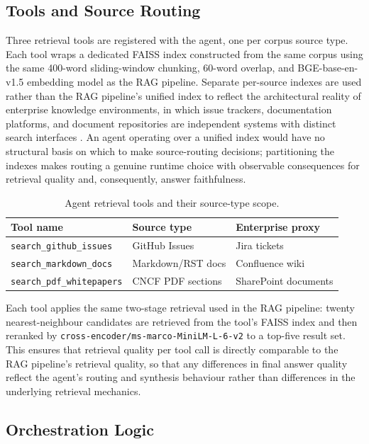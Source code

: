 \subsection{Tools and Source Routing}

Three retrieval tools are registered with the agent, one per corpus source type. Each tool wraps a dedicated FAISS index constructed from the same corpus using the same 400-word sliding-window chunking, 60-word overlap, and BGE-base-en-v1.5 embedding model as the RAG pipeline. Separate per-source indexes are used rather than the RAG pipeline's unified index to reflect the architectural reality of enterprise knowledge environments, in which issue trackers, documentation platforms, and document repositories are independent systems with distinct search interfaces \cite{ferrazzi2026agenticrag}. An agent operating over a unified index would have no structural basis on which to make source-routing decisions; partitioning the indexes makes routing a genuine runtime choice with observable consequences for retrieval quality and, consequently, answer faithfulness.

\begin{table}[ht]
\centering
\small
\setlength{\tabcolsep}{4pt}
\caption{Agent retrieval tools and their source-type scope.}
\label{tab:agent_tools}
\begin{tabular}{lll}
\hline
\textbf{Tool name} & \textbf{Source type} & \textbf{Enterprise proxy} \\
\hline
\texttt{search\_github\_issues}   & GitHub Issues     & Jira tickets \\
\texttt{search\_markdown\_docs}   & Markdown/RST docs & Confluence wiki \\
\texttt{search\_pdf\_whitepapers} & CNCF PDF sections & SharePoint documents \\
\hline
\end{tabular}
\end{table}

Each tool applies the same two-stage retrieval used in the RAG pipeline: twenty nearest-neighbour candidates are retrieved from the tool's FAISS index and then reranked by \texttt{cross-encoder/ms-marco-MiniLM-L-6-v2} to a top-five result set. This ensures that retrieval quality per tool call is directly comparable to the RAG pipeline's retrieval quality, so that any differences in final answer quality reflect the agent's routing and synthesis behaviour rather than differences in the underlying retrieval mechanics.

\subsection{Orchestration Logic}


